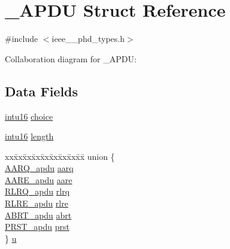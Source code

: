 \hypertarget{struct___a_p_d_u}{}\section{\+\_\+\+A\+P\+D\+U Struct Reference}
\label{struct___a_p_d_u}


{\ttfamily \#include $<$ieee\+\_\+\_\+phd\+\_\+types.\+h$>$}



Collaboration diagram for \+\_\+\+A\+P\+D\+U\+:
\subsection*{Data Fields}
\begin{DoxyCompactItemize}
\item 
\hyperlink{ieee__11073__phd__types_8h_a3561595d2aa7416532e1c9910abd076d}{intu16} \hyperlink{struct___a_p_d_u_a034761fd73babd925f56cbb254ce4fb2}{choice}
\item 
\hyperlink{ieee__11073__phd__types_8h_a3561595d2aa7416532e1c9910abd076d}{intu16} \hyperlink{struct___a_p_d_u_a3743679e4ff85e3e1b3fc2e59973fbb3}{length}
\item 
\begin{tabbing}
xx\=xx\=xx\=xx\=xx\=xx\=xx\=xx\=xx\=\kill
union \{\\
\>\hyperlink{ieee__11073__phd__types_8h_a5630a7402620fa956db66a3c60040a34}{AARQ\_apdu} \hyperlink{struct___a_p_d_u_a486b1d63267a769c42661314733b0b2b}{aarq}\\
\>\hyperlink{ieee__11073__phd__types_8h_a58840d71d6f271606fcef4fd1208d031}{AARE\_apdu} \hyperlink{struct___a_p_d_u_a1b3f7cec711c5079fa06768feb76f7b9}{aare}\\
\>\hyperlink{ieee__11073__phd__types_8h_a4ae46a0f3101a14ba837f04722819389}{RLRQ\_apdu} \hyperlink{struct___a_p_d_u_abcd59037cc4534745afa4bc8c8dfca8d}{rlrq}\\
\>\hyperlink{ieee__11073__phd__types_8h_a55820ca6ec488ab949517a31671ecdc3}{RLRE\_apdu} \hyperlink{struct___a_p_d_u_a5e0affbdd4750dc05394cb9375b30910}{rlre}\\
\>\hyperlink{ieee__11073__phd__types_8h_a013ca190c2d2f77eaf7cc669f223d14d}{ABRT\_apdu} \hyperlink{struct___a_p_d_u_ae3456b433d22314f8800b911b8d630b9}{abrt}\\
\>\hyperlink{ieee__11073__phd__types_8h_a9af7e060ca8d3655329b8de38dac7146}{PRST\_apdu} \hyperlink{struct___a_p_d_u_a9bdc7ac50342aab72d80c676a1bceec8}{prst}\\
\} \hyperlink{struct___a_p_d_u_a0b9e6d2a2283ef4bef6650ac5e6b0907}{u}\\

\end{tabbing}\end{DoxyCompactItemize}


